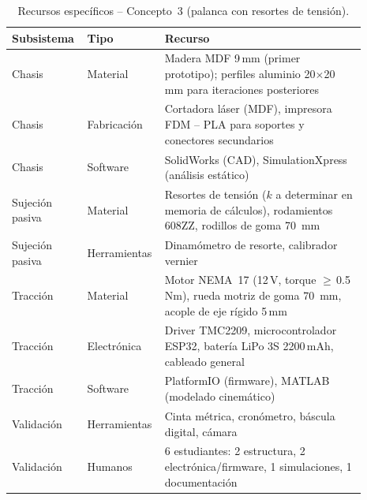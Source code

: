 \documentclass[lettersize,journal]{IEEEtran}
\begin{document}
\begin{table}[H]
\centering
\caption{Recursos específicos -- Concepto~3 (palanca con resortes de tensión).}
\label{tab:recursos_c3}
\scriptsize
\setlength{\tabcolsep}{3pt}
\begin{tabular}{p{0.18\linewidth} p{0.16\linewidth} p{0.55\linewidth}}
\toprule
\textbf{Subsistema} & \textbf{Tipo} & \textbf{Recurso} \\
\midrule
Chasis
    & Material
    & Madera MDF 9\,mm (primer prototipo); perfiles aluminio
      20$\times$20\,mm para iteraciones posteriores \\
Chasis
    & Fabricación
    & Cortadora láser (MDF), impresora FDM -- PLA para
      soportes y conectores secundarios \\
Chasis
    & Software
    & SolidWorks (CAD), SimulationXpress (análisis estático) \\
\midrule
Sujeción pasiva
    & Material
    & Resortes de tensión ($k$ a determinar en memoria de
      cálculos), rodamientos 608ZZ,
      rodillos de goma \SI{70}{\milli\meter} \\
Sujeción pasiva
    & Herramientas
    & Dinamómetro de resorte, calibrador vernier \\
\midrule
Tracción
    & Material
    & Motor NEMA~17 (12\,V, torque $\geq$\,0.5\,Nm),
      rueda motriz de goma \SI{70}{\milli\meter},
      acople de eje rígido 5\,mm \\
Tracción
    & Electrónica
    & Driver TMC2209, microcontrolador ESP32,
      batería LiPo 3S 2200\,mAh, cableado general \\
Tracción
    & Software
    & PlatformIO (firmware), MATLAB (modelado cinemático) \\
\midrule
Validación
    & Herramientas
    & Cinta métrica, cronómetro, báscula digital, cámara \\
Validación
    & Humanos
    & 6 estudiantes: 2 estructura, 2 electrónica/firmware,
      1 simulaciones, 1 documentación \\
\bottomrule
\end{tabular}
\end{table}
\end{document}
